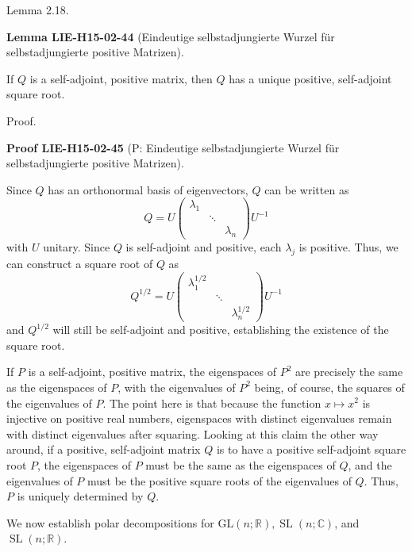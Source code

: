 \documentclass[10pt, letterpaper]{article}
\newcommand{\CustomHeading}[3]{%
  \par\medskip\noindent%
  \textbf{#1 #2} \textnormal{(#3)}.\enskip%
}
\newenvironment{LEM}[2]{\begin{unitbox}\CustomHeading{Lemma}{#1}{#2}}{\end{unitbox}}
\newenvironment{PROOF}[2]{\begin{unitbox}\CustomHeading{Proof}{#1}{#2}}{\end{unitbox}}
\begin{document}
    
Lemma 2.18. 

\begin{LEM}{LIE-H15-02-44}{Eindeutige selbstadjungierte Wurzel für selbstadjungierte positive Matrizen}
If $Q$ is a self-adjoint, positive matrix, then $Q$ has a unique positive, self-adjoint square root.
\end{LEM}

Proof. 

\begin{PROOF}{LIE-H15-02-45}{P: Eindeutige selbstadjungierte Wurzel für selbstadjungierte positive Matrizen}
Since $Q$ has an orthonormal basis of eigenvectors, $Q$ can be written as
$$
Q=U\left(\begin{array}{lll}
\lambda_{1} & & \\
& \ddots & \\
& & \lambda_{n}
\end{array}\right) U^{-1}
$$
with $U$ unitary. Since $Q$ is self-adjoint and positive, each $\lambda_{j}$ is positive. Thus, we can construct a square root of $Q$ as
$$
Q^{1 / 2}=U\left(\begin{array}{lll}
\lambda_{1}^{1 / 2} & & \\
& \ddots & \\
& & \lambda_{n}^{1 / 2}
\end{array}\right) U^{-1}
$$
and $Q^{1 / 2}$ will still be self-adjoint and positive, establishing the existence of the square root.


If $P$ is a self-adjoint, positive matrix, the eigenspaces of $P^{2}$ are precisely the same as the eigenspaces of $P$, with the eigenvalues of $P^{2}$ being, of course, the squares of the eigenvalues of $P$. The point here is that because the function $x \mapsto x^{2}$ is injective on positive real numbers, eigenspaces with distinct eigenvalues remain with distinct eigenvalues after squaring. Looking at this claim the other way around, if a positive, self-adjoint matrix $Q$ is to have a positive self-adjoint square root $P$, the eigenspaces of $P$ must be the same as the eigenspaces of $Q$, and the eigenvalues of $P$ must be the positive square roots of the eigenvalues of $Q$. Thus, $P$ is uniquely determined by $Q$.
\end{PROOF}





We now establish polar decompositions for $\mathrm{GL}(n ; \mathbb{R}), \operatorname{SL}(n ; \mathbb{C})$, and $\operatorname{SL}(n ; \mathbb{R})$.
\end{document}
